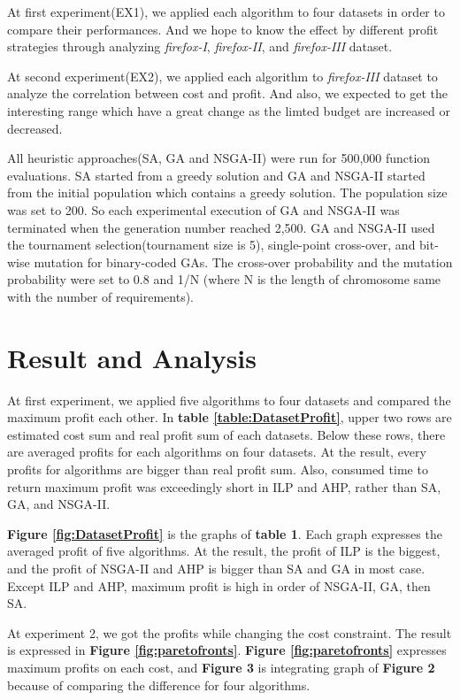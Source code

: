 At first experiment(EX1), we applied each algorithm to four datasets in order to compare their performances. And we hope to know the effect by different profit strategies through analyzing \textit{firefox-I}, \textit{firefox-II}, and \textit{firefox-III} dataset.

At second experiment(EX2), we applied each algorithm to \textit{firefox-III} dataset to analyze the correlation between cost and profit. And also, we expected to get the interesting range which have a great change as the limted budget are increased or decreased.

All heuristic approaches(SA, GA and NSGA-II) were run for 500,000 function evaluations. SA started from a greedy solution and GA and NSGA-II started from the initial population which contains a greedy solution. The population size was set to 200. So each experimental execution of GA and NSGA-II was terminated when the generation number reached 2,500. GA and NSGA-II used the tournament selection(tournament size is 5), single-point cross-over, and bit-wise mutation for binary-coded GAs. The cross-over probability and the mutation probability were set to 0.8 and 1/N (where N is the length of chromosome same with the number of requirements).


\section{Result and Analysis}
At first experiment, we applied five algorithms to four datasets and compared the maximum profit each other. In \textbf{table \ref{table:DatasetProfit}}, upper two rows are estimated cost sum and real profit sum of each datasets. Below these rows, there are averaged profits for each algorithms on four datasets. At the result, every profits for algorithms are bigger than real profit sum. Also, consumed time to return maximum profit was exceedingly short in ILP and AHP, rather than SA, GA, and NSGA-II.

\textbf{Figure \ref{fig:DatasetProfit}} is the graphs of \textbf{table 1}. Each graph expresses the averaged profit of five algorithms. At the result, the profit of ILP is the biggest, and the profit of NSGA-II and AHP is bigger than SA and GA in most case. Except ILP and AHP, maximum profit is high in order of NSGA-II, GA, then SA.

At experiment 2, we got the profits while changing the cost constraint. The result is expressed in \textbf{Figure \ref{fig:paretofronts}}. \textbf{Figure \ref{fig:paretofronts}} expresses maximum profits on each cost, and \textbf{Figure 3} is integrating graph of \textbf{Figure 2} because of comparing the difference for four algorithms.

